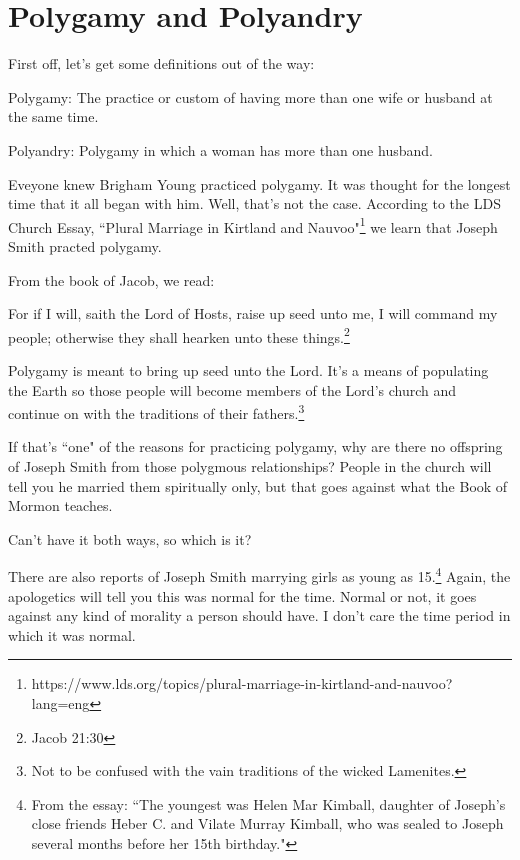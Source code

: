 \chapter{Polygamy and Polyandry}

First off, let's get some definitions out of the way:

\begin{displayquote}
Polygamy: The practice or custom of having more than one wife or husband at the same 
time.
\end{displayquote}

\begin{displayquote}
Polyandry: Polygamy in which a woman has more than one husband.
\end{displayquote}

Eveyone knew Brigham Young practiced polygamy. It was thought for the longest time 
that it all began with him. Well, that's not the case. According to the LDS Church
Essay, ``Plural Marriage in Kirtland and Nauvoo"\footnote{
https://www.lds.org/topics/plural-marriage-in-kirtland-and-nauvoo?lang=eng
} we learn that Joseph Smith practed polygamy.

From the book of Jacob, we read:

\begin{displayquote}
For if I will, saith the Lord of Hosts, raise up seed unto me, 
I will command my people; otherwise they shall hearken unto these 
things.\footnote{Jacob 21:30}
\end{displayquote}

Polygamy is meant to bring up seed unto the Lord. It's a means of populating the
Earth so those people will become members of the Lord's church and continue on with
the traditions of their fathers.\footnote{Not to be confused with the vain traditions
of the wicked Lamenites.}

If that's ``one" of the reasons for practicing polygamy, why are there no offspring
of Joseph Smith from those polygmous relationships? People in the church will tell
you he married them spiritually only, but that goes against what the Book of Mormon
teaches.

Can't have it both ways, so which is it?

There are also reports of Joseph Smith marrying girls as young as 15.\footnote{
From the essay: ``The youngest was Helen Mar Kimball, daughter of Joseph’s close 
friends Heber C. and Vilate Murray Kimball, who was sealed to Joseph several 
months before her 15th birthday."
} Again, the apologetics will tell you this was normal for the time. Normal or not,
it goes against any kind of morality a person should have. I don't care the time
period in which it was normal.

